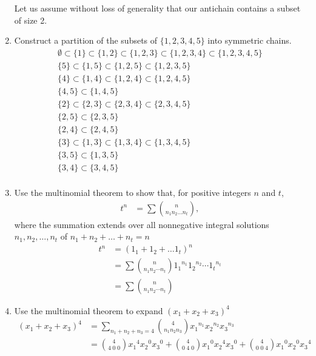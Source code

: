 \documentclass{article}
\begin{document}
\begin{enumerate}
Let us assume without loss of generality that our antichain contains a subset of size 2.
\setcounter{enumi}{32}\item
Construct a partition of the subsets of $\{1,2,3,4,5\}$ into symmetric chains.
\begin{align*}
  \emptyset\subset\{1\}\subset\{1,2\}\subset\{1,2,3\}\subset\{1,2,3,4\}\subset\{1,2,3,4,5\}\\
  \{5\}\subset\{1,5\}\subset\{1,2,5\}\subset\{1,2,3,5\}\\
  \{4\}\subset\{1,4\}\subset\{1,2,4\}\subset\{1,2,4,5\}\\
  \{4,5\}\subset\{1,4,5\}\\
  \{2\}\subset\{2,3\}\subset\{2,3,4\}\subset\{2,3,4,5\}\\
  \{2,5\}\subset\{2,3,5\}\\
  \{2,4\}\subset\{2,4,5\}\\
  \{3\}\subset\{1,3\}\subset\{1,3,4\}\subset\{1,3,4,5\}\\
  \{3,5\}\subset\{1,3,5\}\\
  \{3,4\}\subset\{3,4,5\}\\
\end{align*}
\setcounter{enumi}{36}\item
Use the multinomial theorem to show that, for positive integers $n$ and $t$,
\begin{align*}
  t^n&=\sum{\binom{n}{n_1n_2\dots n_t}},
\end{align*}
where the summation extends over all nonnegative integral solutions $n_1,n_2,\dots,n_t$ of $n_1+n_2+\dots+n_t=n$
\begin{align*}
  t^n&=(1_1+1_2+\dots1_t)^n\\
  &=\sum{\binom{n}{n_1n_2\cdots n_t}{1_1}^{n_1}{1_2}^{n_2}\cdots{1_t}^{n_t}}\\
  &=\sum{\binom{n}{n_1n_2\cdots n_t}}
\end{align*}
\item
Use the multinomial theorem to expand $(x_1+x_2+x_3)^4$
\begin{align*}
  (x_1+x_2+x_3)^4&=\sum\limits_{n_1+n_2+n_3=4}{\binom{4}{n_1n_2n_3}{x_1}^{n_1}{x_2}^{n_2}{x_3}^{n_3}}\\
  &=\binom{4}{4\;0\;0}{x_1}^4{x_2}^0{x_3}^0
  +\binom{4}{0\;4\;0}{x_1}^0{x_2}^4{x_3}^0
  +\binom{4}{0\;0\;4}{x_1}^0{x_2}^0{x_3}^4\\

\end{align*}
\end{enumerate}
\end{document}
